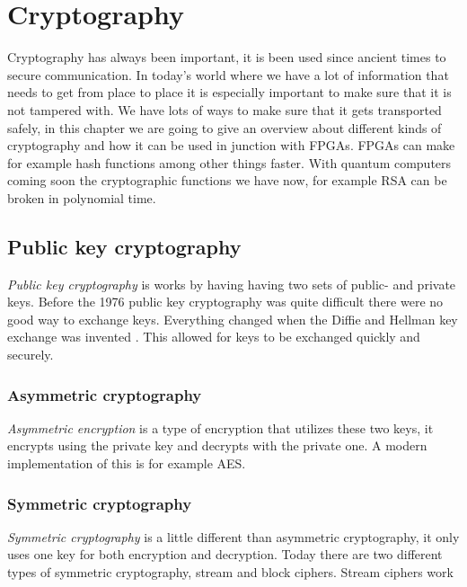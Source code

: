 \chapter{Cryptography\label{crypto}}
Cryptography has always been important, it is been used since ancient times to
secure communication. In today's world where we have a lot of information that %
needs to get from place to place it is especially important to make sure that
it is not tampered with. We have lots of ways to make sure that it gets
transported safely, in this chapter we are going to give an overview about
different kinds of cryptography and how it can be used in junction with FPGAs.
FPGAs can make for example hash functions among other things faster. With
quantum computers coming soon the cryptographic functions we have now, for
example RSA can be broken in polynomial time.

\section{Public key cryptography}
\textit{Public key cryptography} is works by having having two sets of public- and
private keys. Before the 1976 public key cryptography was quite difficult there
were no good way to exchange keys. Everything changed when the Diffie and
Hellman key exchange was invented \citep[Ch. 2]{FranciscoRodriguez-Henriquez10}. This
allowed for keys to be exchanged quickly and securely.

\subsection{Asymmetric cryptography}
\textit{Asymmetric encryption} is a type of encryption that utilizes these two
keys, it encrypts using the private key and decrypts with the private one.
A modern implementation of this is for example AES.


\subsection{Symmetric cryptography}
\textit{Symmetric cryptography} is a little different than asymmetric
cryptography, it only uses one key for both encryption and decryption. Today
there are two different types of symmetric cryptography, stream and block
ciphers. Stream ciphers work

